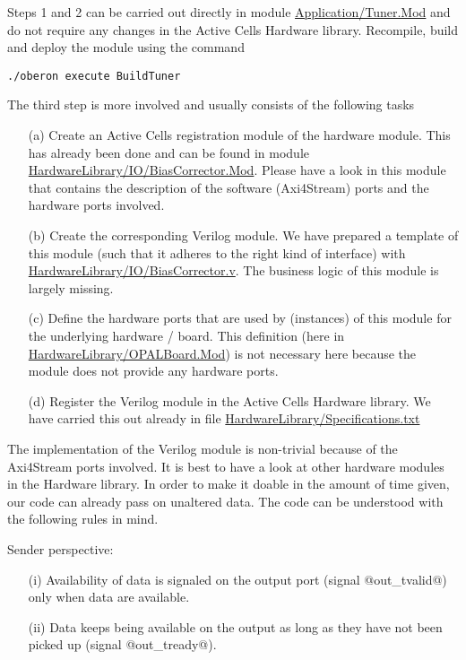 \documentclass[10pt, a4]{article}
\begin{document}
Steps 1 and 2 can be carried out directly in module \href{\apath/Application/Tuner.Mod}{Application/Tuner.Mod} and do not require any changes in the Active Cells Hardware library. Recompile, build and deploy the module using  the command 
\begin{lstlisting}[style=example]
./oberon execute BuildTuner
\end{lstlisting}

The third step is more involved and usually consists of the following tasks
\begin{enumerate}
\item[(a)] Create an Active Cells registration module of the hardware module.  This has already been done and can be found in module \href{\apath/HardwareLibrary/IO/BiasCorrector.Mod}{HardwareLibrary/IO/BiasCorrector.Mod}. Please have a look in this module that contains the description of the software (Axi4Stream) ports and the hardware ports involved.
\item[(b)] Create the corresponding Verilog module. We have prepared a template of this module (such that it adheres to the right kind of interface) with \href{\apath/HardwareLibrary/IO/BiasCorrector.v}{HardwareLibrary/IO/BiasCorrector.v}. The business logic of this module is largely missing.
\item[(c)] Define the hardware ports that are used by (instances) of this module for the underlying hardware / board. This definition (here in \href{\apath/HardwareLibrary/OPALBoard.Mod}{HardwareLibrary/OPALBoard.Mod})  is not necessary here because the module does not provide any hardware ports. 
\item[(d)] Register the Verilog module in the Active Cells Hardware library. We have carried this out already in file \href{\apath/HardwareLibrary/Specifications.txt}{HardwareLibrary/Specifications.txt}
\end{enumerate}

The implementation of the Verilog module is non-trivial because of the Axi4Stream ports involved. It is best to have a look at other hardware modules in the Hardware library. In order to make it doable in the amount of time given, our code can already pass on unaltered data. The code can be understood with the following rules in mind.

Sender perspective:
\begin{enumerate}
\item[(i)] Availability of data is signaled on the output port (signal @out_tvalid@) only when data are available. 
\item[(ii)] Data keeps being available on the output as long as they have not been picked up (signal @out_tready@). 
\end{enumerate}
\end{document}
